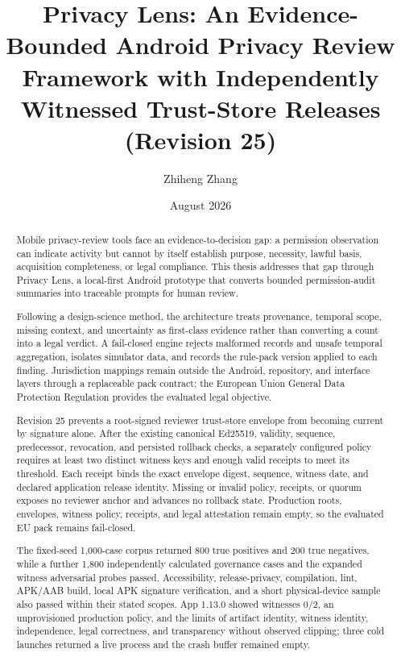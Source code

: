 \documentclass[11pt,a4paper]{article}
\title{Privacy Lens: An Evidence-Bounded Android Privacy Review Framework with Independently Witnessed Trust-Store Releases (Revision 25)}
\author{Zhiheng Zhang}
\date{August 2026}
\begin{document}
\maketitle
\begin{abstract}
\small\singlespacing
Mobile privacy-review tools face an evidence-to-decision gap: a permission observation can indicate activity but cannot by itself establish purpose, necessity, lawful basis, acquisition completeness, or legal compliance. This thesis addresses that gap through Privacy Lens, a local-first Android prototype that converts bounded permission-audit summaries into traceable prompts for human review.

Following a design-science method, the architecture treats provenance, temporal scope, missing context, and uncertainty as first-class evidence rather than converting a count into a legal verdict. A fail-closed engine rejects malformed records and unsafe temporal aggregation, isolates simulator data, and records the rule-pack version applied to each finding. Jurisdiction mappings remain outside the Android, repository, and interface layers through a replaceable pack contract; the European Union General Data Protection Regulation provides the evaluated legal objective.

Revision 25 prevents a root-signed reviewer trust-store envelope from becoming current by signature alone. After the existing canonical Ed25519, validity, sequence, predecessor, revocation, and persisted rollback checks, a separately configured policy requires at least two distinct witness keys and enough valid receipts to meet its threshold. Each receipt binds the exact envelope digest, sequence, witness date, and declared application release identity. Missing or invalid policy, receipts, or quorum exposes no reviewer anchor and advances no rollback state. Production roots, envelopes, witness policy, receipts, and legal attestation remain empty, so the evaluated EU pack remains fail-closed.

The fixed-seed 1,000-case corpus returned 800 true positives and 200 true negatives, while a further 1,800 independently calculated governance cases and the expanded witness adversarial probes passed. Accessibility, release-privacy, compilation, lint, APK/AAB build, local APK signature verification, and a short physical-device sample also passed within their stated scopes. App 1.13.0 showed witnesses 0/2, an unprovisioned production policy, and the limits of artifact identity, witness identity, independence, legal correctness, and transparency without observed clipping; three cold launches returned a live process and the crash buffer remained empty.


\end{abstract}
\end{document}
